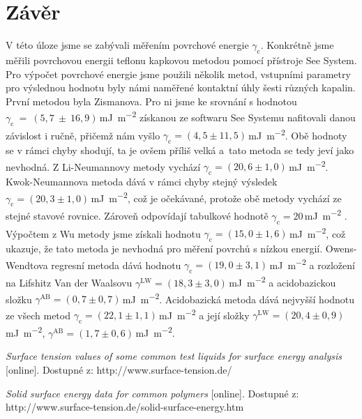\documentclass{protokol}
\begin{document}
\section{Závěr}
V této úloze jsme se zabývali měřením povrchové energie  $\gamma_{\text{c}}$. 
Konkrétně jsme měřili povrchovou energii teflonu kapkovou metodou pomocí 
přístroje See System. Pro výpočet povrchové energie jsme použili několik metod, 
vstupními parametry pro výslednou hodnotu byly námi naměřené kontaktní úhly 
šesti různých kapalin. První metodou byla Zismanova. Pro ni jsme ke srovnání s 
hodnotou $\gamma_{\text{c}}~=~(5,7~\pm~16,9)$\,\si{\milli\joule\per\meter\squared} získanou ze softwaru See 
Systemu nafitovali danou závislost i ručně, přičemž nám vyšlo 
$\gamma_{\text{c}} = (4,5\pm11,5)$\,\si{\milli\joule\per\meter\squared}. Obě 
hodnoty se v rámci chyby shodují, ta je ovšem příliš velká a~tato metoda se 
tedy jeví jako nevhodná. Z Li-Neumannovy metody vychází $\gamma_{\text{c}} = 
(20,6\pm1,0)$\,\si{\milli\joule\per\meter\squared}. Kwok-Neumannova metoda dává 
v rámci chyby stejný výsledek $\gamma_{\text{c}} = 
(20,3\pm1,0)$\,\si{\milli\joule\per\meter\squared}, což je očekávané, protože 
obě metody vychází ze stejné stavové rovnice. Zároveň odpovídají tabulkové 
hodnotě $\gamma_{\text{c}} = 20$\,\si{\milli\joule\per\meter\squared} 
\cite{napetiTeflon}. Výpočtem z Wu metody jsme získali hodnotu 
$\gamma_{\text{c}} = (15,0\pm1,6)$\,\si{\milli\joule\per\meter\squared}, což 
ukazuje, že tato metoda je nevhodná pro měření povrchů s nízkou energií. 
Owens-Wendtova regresní metoda dává hodnotu $\gamma_{\text{c}} = 
(19,0\pm3,1)$\,\si{\milli\joule\per\meter\squared} a rozložení na Lifshitz Van 
der Waalsovu $\gamma^\text{LW} = 
(18,3\pm3,0)$\,\si{\milli\joule\per\meter\squared} a acidobazickou složku
$\gamma^\text{AB} = (0,7\pm0,7)$\,\si{\milli\joule\per\meter\squared}. 
Acidobazická metoda dává nejvyšší hodnotu ze všech metod $\gamma_{\text{c}} = 
(22,1\pm1,1)$\,\si{\milli\joule\per\meter\squared} a její složky 
$\gamma^\text{LW} = (20,4\pm0,9)$\,\si{\milli\joule\per\meter\squared}, 
$\gamma^\text{AB} = (1,7\pm0,6)$\,\si{\milli\joule\per\meter\squared}.
\newpage
\begin{thebibliography}{10}
	 {\textit{Surface tension values of some common test 
	liquids for surface energy analysis} [online]. Dostupné z: 
	http://www.surface-tension.de/}
	
	 {\textit{Solid surface energy data for common polymers} [online]. Dostupné z: http://www.surface-tension.de/solid-surface-energy.htm}

	
\end{thebibliography}
\end{document}
